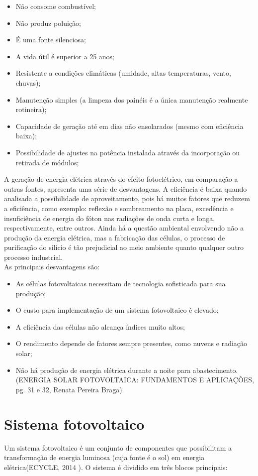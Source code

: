 \begin{itemize}
\item Não consome combustível;
\item Não produz poluição;
\item É uma fonte silenciosa;
\item A vida útil é superior a 25 anos;
\item Resistente a condições climáticas (umidade, altas temperaturas, vento, chuvas);
\item Manutenção simples (a limpeza dos painéis é a única manutenção realmente rotineira);
\item Capacidade de geração até em dias não ensolarados (mesmo com eficiência baixa);
\item Possibilidade de ajustes na potência instalada através da incorporação ou retirada de módulos;
\end{itemize}

A geração de energia elétrica através do efeito fotoelétrico, em comparação a outras fontes, apresenta uma série de desvantagens. A eficiência é baixa quando analisada a possibilidade de aproveitamento, pois há muitos fatores que reduzem a eficiência, como exemplo: reflexão e sombreamento na placa, excedência e insuficiência de energia do fóton nas radiações de onda curta e longa, respectivamente, entre outros. Ainda há a questão ambiental envolvendo não a produção da energia elétrica, mas a fabricação das células, o processo de purificação do silício é tão prejudicial ao meio ambiente quanto qualquer outro processo industrial.
\\ As principais desvantagens são:

\begin{itemize}
\item As células fotovoltaicas necessitam de tecnologia sofisticada para sua produção;
\item O custo para implementação de um sistema fotovoltaico é elevado;
\item A eficiência das células não alcança índices muito altos;
\item O rendimento depende de fatores sempre presentes, como nuvens e radiação solar;
\item Não há produção de energia elétrica durante a noite para abastecimento.
(ENERGIA SOLAR FOTOVOLTAICA: FUNDAMENTOS E APLICAÇÕES, pg. 31 e 32, Renata Pereira Braga).
\end{itemize}

\section{Sistema fotovoltaico}
Um sistema fotovoltaico é um conjunto de componentes que possibilitam a transformação de energia luminosa (cuja fonte é o sol) em energia elétrica(ECYCLE, 2014 ). O sistema é dividido em três blocos principais:

